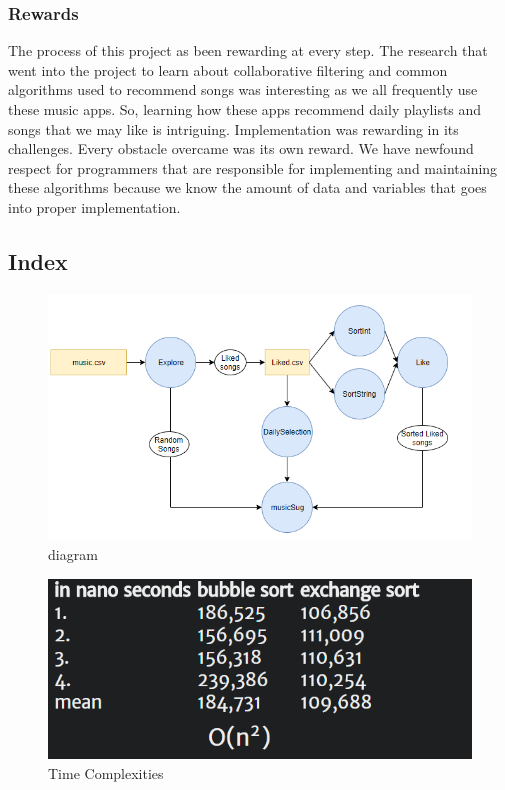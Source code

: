 \documentclass[]{article}
\begin{document}
\subsubsection{Rewards}\label{rewards}

The process of this project as been rewarding at every step. The
research that went into the project to learn about collaborative
filtering and common algorithms used to recommend songs was interesting
as we all frequently use these music apps. So, learning how these apps
recommend daily playlists and songs that we may like is intriguing.
Implementation was rewarding in its challenges. Every obstacle overcame
was its own reward. We have newfound respect for programmers that are
responsible for implementing and maintaining these algorithms because we
know the amount of data and variables that goes into proper
implementation.

\subsection{Index}\label{index}

\begin{figure}
\centering
\includegraphics{../images/diagram.PNG}
\caption{diagram}
\end{figure}

\begin{figure}
\centering
\includegraphics{../images/TimeComplex.PNG}
\caption{Time Complexities}
\end{figure}
\end{document}
